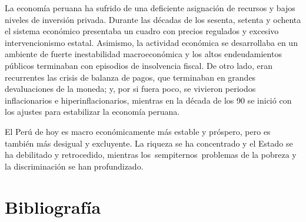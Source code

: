\documentclass[
  jou,
  floatsintext,
  longtable,
  a4paper,
  nolmodern,
  notxfonts,
  notimes,
  12pt,
  colorlinks=true,linkcolor=blue,citecolor=blue,urlcolor=blue]{apa7}
\begin{document}
La economía peruana ha sufrido de una deficiente asignación de recursos
y bajos niveles de inversión privada. Durante las décadas de los
sesenta, setenta y ochenta el sistema económico presentaba un cuadro con
precios regulados y excesivo intervencionismo estatal. Asimismo, la
actividad económica se desarrollaba en un ambiente de fuerte
inestabilidad macroeconómica y los altos endeudamientos públicos
terminaban con episodios de insolvencia fiscal. De otro lado, eran
recurrentes las crisis de balanza de pagos, que terminaban en grandes
devaluaciones de la moneda; y, por si fuera poco, se vivieron periodos
inflacionarios e hiperinflacionarios, mientras en la década de los 90 se
inició con los ajustes para estabilizar la economía peruana.

El Perú de hoy es macro económicamente más estable y próspero, pero es
también más desigual y excluyente. La riqueza se ha concentrado y el
Estado se ha debilitado y retrocedido, mientras
los~sempiternos~problemas de la pobreza y la discriminación se han
profundizado.

\section{Bibliografía}\label{bibliografuxeda}
\end{document}
